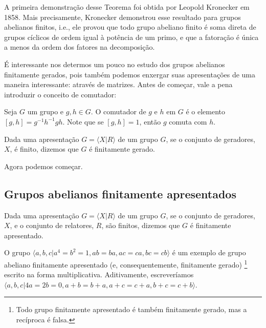     	\par\vspace{0.3cm} A primeira demonstração desse Teorema foi obtida por Leopold Kronecker em 1858. 
    	Mais precisamente, Kronecker demonstrou esse resultado para grupos abelianos finitos, i.e., ele 
    	provou que todo grupo abeliano finito é soma direta de grupos cíclicos de ordem igual à potência 
    	de um primo, e que a fatoração é única a menos da ordem dos fatores na decomposição.
    	
    	\par\vspace{0.3cm} É interessante nos determos um pouco no estudo dos grupos abelianos finitamente
    	gerados, pois também podemos enxergar suas apresentações de uma maneira interessante: 
    	através de matrizes. Antes de começar, vale a pena introduzir o conceito de comutador:
    	\begin{deff}
    	\label{def comutador}
    	    Seja $G$ um grupo e $g,h\in G$. O comutador de $g$ e $h$ em $G$ é o elemento 
    	    $[g,h] = g^{-1}h^{-1}gh$. Note que se $[g,h]=1$, então $g$ comuta com $h$.
    	\end{deff}
    	\begin{deff}
    	\label{def grupo finitamente gerado}
    		Dada uma apresentação $G = \langle  X|R \rangle$ de um grupo $G$, se o conjunto 
    		de geradores, $X$, é finito, dizemos que $G$ é finitamente gerado.
    	\end{deff}
    	\par\vspace{0.3cm} Agora podemos começar.
    	\subsection{Grupos abelianos finitamente apresentados}
    	\begin{deff}
    	\label{def grupo finitamente apresentado}
    		Dada uma apresentação $G = \langle X|R \rangle$ de um grupo $G$, se o conjunto de geradores, 
    		$X$, e o conjunto de relatores, $R$, são finitos, dizemos que $G$ é finitamente apresentado.
    	\end{deff}
    	\par\vspace{0.3cm} O grupo $\langle a,b,c|a^4=b^2=1, ab=ba, ac=ca,bc=cb \rangle $ é um exemplo 
    	de grupo abeliano finitamente apresentado (e, consequentemente, finitamente gerado)
    	\footnote{Todo grupo finitamente apresentado é também finitamente gerado, mas a recíproca é falsa.}
    	escrito na forma multiplicativa. Aditivamente, escreveríamos 
    	$\langle a,b,c|4a=2b=0, a+b=b+a, a+c=c+a, b+c=c+b \rangle$. 
    	

